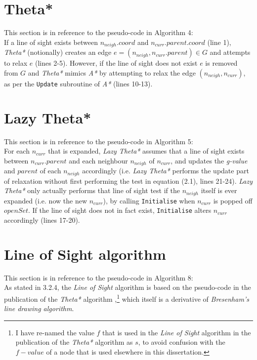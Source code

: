 \section{Theta*}
This section is in reference to the pseudo-code in Algorithm 4:\\

\noindent If a line of sight exists between $n_{neigh}.coord$ and $n_{curr}.parent.coord$ (line 1), {\em Theta*} (notionally) creates an edge $e = (n_{neigh}, n_{curr}.parent) \in G$ and attempts to relax $e$ (lines 2-5). However, if the line of sight does not exist $e$ is removed from $G$ and {\em Theta*} mimics {\em A*} by attempting to relax the edge $(n_{neigh},n_{curr})$, as per the {\tt Update} subroutine of {\em A*} (lines 10-13).


\section{Lazy Theta*}
This section is in reference to the pseudo-code in Algorithm 5:\\

\noindent For each $n_{curr}$ that is expanded, {\em Lazy Theta*} assumes that a line of sight exists between $n_{curr}.parent$ and each neighbour $n_{neigh}$ of $n_{curr}$, and updates the {\em g-value} and $parent$ of each $n_{neigh}$ accordingly (i.e. {\em Lazy Theta*} performs the update part of relaxation without first performing the test in equation (2.1), lines 21-24). {\em Lazy Theta*} only actually performs that line of sight test if the $n_{neigh}$ itself is ever expanded (i.e. now the new $n_{curr}$), by calling {\tt Initialise} when $n_{curr}$ is popped off $openSet$. If the line of sight does not in fact exist, {\tt Initialise} alters $n_{curr}$ accordingly (lines 17-20).

\section{Line of Sight algorithm}
This section is in reference to the pseudo-code in Algorithm 8:\\

\noindent
As stated in 3.2.4, the {\em Line of Sight} algorithm is based on the pseudo-code in the publication of the {\em Theta*} algorithm \cite{Daniel10},\footnote{I have re-named the value $f$ that is used in the {\em Line of Sight} algorithm in the publication of the {\em Theta*} algorithm as $s$, to avoid confusion with the $f-value$ of a node that is used elsewhere in this dissertation.} which itself is a derivative of {\em Bresenham's line drawing algorithm}\cite{Bresenham65}.\\

